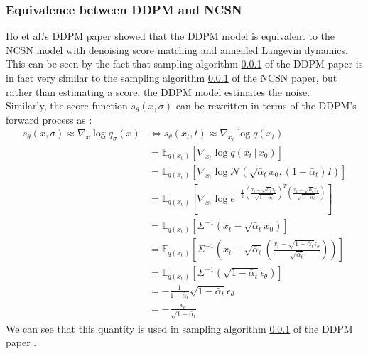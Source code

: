 \documentclass{article}
\begin{document}
\subsubsection{Equivalence between DDPM and NCSN}
Ho et al.'s DDPM paper \cite{ho2020denoising} showed that the DDPM model is equivalent to the NCSN model with denoising score matching and annealed Langevin dynamics. \\
This can be seen by the fact that sampling algorithm \ref{} of the DDPM paper is in fact very similar to the sampling algorithm \ref{} of the NCSN paper, but rather than estimating a score, the DDPM model estimates the noise. \cite{ho2020denoising} \\
Similarly, the score function $s_\theta (x, \sigma)$ can be rewritten in terms of the DDPM's forward process as \cite{weng2021diffusion}:
{
  \allowdisplaybreaks
  \begin{align}
    s_\theta (x, \sigma) \approx \nabla_x \log q_\sigma (x) &\Leftrightarrow s_\theta (x_t, t) \approx \nabla_{x_t} \log q(x_t) \\
    &= \mathbb{E}_{q (x_0)} \left[ \nabla_{x_t} \log q(x_t \, | \, x_0) \right] \\
    &= \mathbb{E}_{q (x_0)} \left[ \nabla_{x_t} \log \mathcal{N} (\sqrt{\bar{\alpha}_t} x_0, (1 - \bar{\alpha}_t) I) \right] \\
    &= \mathbb{E}_{q (x_0)} \left[ \nabla_{x_t} \log e^{- \frac{1}{2} \left( \frac{x_t - \sqrt{\bar{\alpha}_t} x_0}{\sqrt{1 - \bar{\alpha}_t}} \right)^T \left( \frac{x_t - \sqrt{\bar{\alpha}_t} x_0}{\sqrt{1 - \bar{\alpha}_t}} \right)} \right] \\
    &= \mathbb{E}_{q (x_0)} \left[ \Sigma^{-1} (x_t - \sqrt{\bar{\alpha}_t} x_0) \right] \\
    &= \mathbb{E}_{q (x_0)} \left[ \Sigma^{-1} \left(x_t - \sqrt{\bar{\alpha}_t} \left( \frac{x_t - \sqrt{1 - \bar{\alpha}_t} \epsilon_\theta}{\sqrt{\bar{\alpha}_t}} \right) \right) \right] \\
    &= \mathbb{E}_{q (x_0)} \left[ \Sigma^{-1} \left( \sqrt{1 - \bar{\alpha}_t} \epsilon_\theta \right) \right] \\
    &= - \frac{1}{1 - \bar{\alpha}_t}  \sqrt{1 - \bar{\alpha}_t} \epsilon_\theta \\
    &= - \frac{\epsilon_\theta}{\sqrt{1 - \bar{\alpha}_t}}
  \end{align}
  We can see that this quantity is used in sampling algorithm \ref{} of the DDPM paper \cite{ho2020denoising}. 
}
\end{document}
